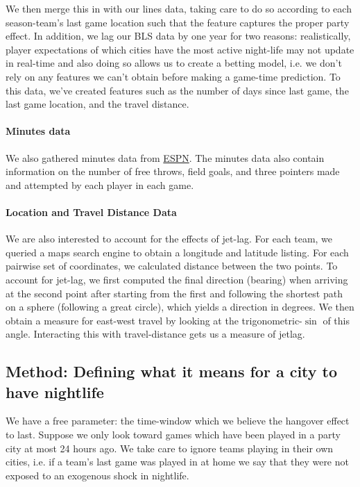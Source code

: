 \documentclass[letterpaper,12pt]{article}
\begin{document}
We then merge this in with our lines data, taking care to do so according to each season-team's last game location such that the feature captures the proper
party effect. In addition, we lag our BLS data by one year for two reasons:
realistically, player expectations of which cities have the most active night-life may not
update in real-time and also doing so allows us to create a betting model, i.e.
we don't rely on any features we can't obtain before making a game-time prediction. 
To this data, we've created features such as 
the number of days since last game, the last game location, and the travel distance. 

\paragraph{Minutes data}
We also gathered minutes data from \href{http://www.espn.com/nba/scoreboard/_/date/}{ESPN}.
The minutes data also contain information on the number of free throws, field goals, and three pointers made and attempted by each player in each game.

\paragraph{Location and Travel Distance Data} We are also interested
to account for the effects of jet-lag. For each team, we queried
a maps search engine to obtain a longitude and latitude listing.\cite{ggmap}
For each pairwise set of coordinates, we calculated distance between the two
points.\cite{sp} To account for jet-lag, we first computed the final direction 
(bearing) when arriving at the 
second point after starting from the first and following the shortest path on a sphere 
(following a great circle), which yields a direction in degrees. 
We then obtain a measure for east-west travel by looking at the trigonometric-$\sin$ of this angle.
Interacting this with travel-distance gets us a measure of jetlag.\cite{lallensack}

\subsection{Method: Defining what it means for a city to have nightlife}
We have a free parameter: the time-window which we believe the hangover effect
to last. Suppose we only look toward games which have been played in a party
city at most 24 hours ago. We take care to ignore
teams playing in their own cities, i.e. if a team's last game was played in at home 
we say that they were not exposed to an exogenous shock in nightlife.
\end{document}
